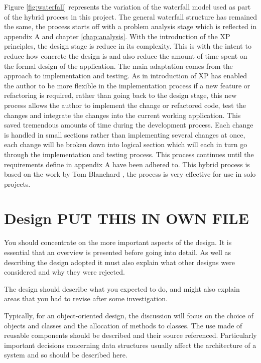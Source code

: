 Figure \ref{fig:waterfall} represents the variation of the waterfall model used as part of the hybrid process in this project. The general waterfall structure has remained the same, the process starts off with a problem analysis stage which is reflected in appendix A and chapter \ref{chap:analysis}. With the introduction of the XP principles, the design stage is reduce in its complexity. This is with the intent to reduce how concrete the design is and also reduce the amount of time spent on the formal design of the application. The main adaptation comes from the approach to implementation and testing. As in introduction of XP has enabled the author to be more flexible in the implementation process if a new feature or refactoring is required, rather than going back to the design stage, this new process allows the author to implement the change or refactored code, test the changes and integrate the changes into the current working application. This saved tremendous amounts of time during the development process. Each change is handled in small sections rather than implementing several changes at once, each change will be broken down into logical section which will each in turn go through the implementation and testing process. This process continues until the requirements define in appendix A have been adhered to. This hybrid process is based on the work by Tom Blanchard \cite{tblanch:diss}, the process is very effective for use in solo projects.



\chapter{Design PUT THIS IN OWN FILE}

You should concentrate on the more important aspects of the design. It is essential that an overview is presented before going into detail. As well as describing the design adopted it must also explain what other designs were considered and why they were rejected.

The design should describe what you expected to do, and might also explain areas that you had to revise after some investigation.

Typically, for an object-oriented design, the discussion will focus on the choice of objects and classes and the allocation of methods to classes. The use made of reusable components should be described and their source referenced. Particularly important decisions concerning data structures usually affect the architecture of a system and so should be described here.

